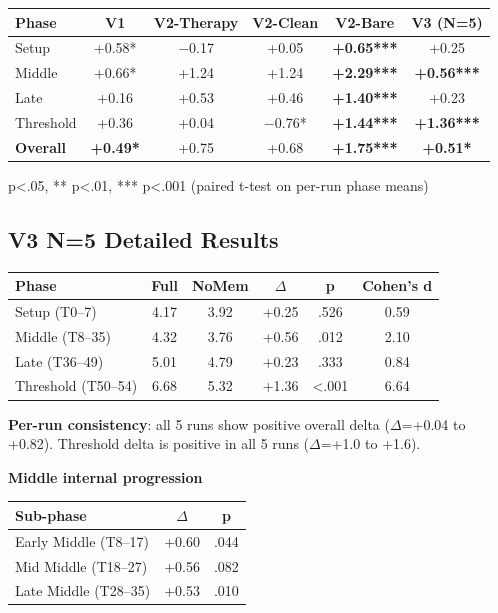 \documentclass[11pt]{article}
\begin{document}
\begin{table}[h]
\centering
\begin{tabular}{lccccc}
\toprule
Phase & V1 & V2-Therapy & V2-Clean & V2-Bare & V3 (N=5) \\
\midrule
Setup & +0.58* & $-$0.17 & +0.05 & \textbf{+0.65***} & +0.25 \\
Middle & +0.66* & +1.24 & +1.24 & \textbf{+2.29***} & \textbf{+0.56***} \\
Late & +0.16 & +0.53 & +0.46 & \textbf{+1.40***} & +0.23 \\
Threshold & +0.36 & +0.04 & $-$0.76* & \textbf{+1.44***} & \textbf{+1.36***} \\
\textbf{Overall} & \textbf{+0.49*} & +0.75 & +0.68 & \textbf{+1.75***} & \textbf{+0.51*} \\
\bottomrule
\end{tabular}
\end{table}

\noindent * p<.05, ** p<.01, *** p<.001 (paired t-test on per-run phase means)

\subsection{V3 N=5 Detailed Results}

\begin{table}[h]
\centering
\begin{tabular}{lccccc}
\toprule
Phase & Full & NoMem & $\Delta$ & p & Cohen's d \\
\midrule
Setup (T0--7) & 4.17 & 3.92 & +0.25 & .526 & 0.59 \\
Middle (T8--35) & 4.32 & 3.76 & +0.56 & .012 & 2.10 \\
Late (T36--49) & 5.01 & 4.79 & +0.23 & .333 & 0.84 \\
Threshold (T50--54) & 6.68 & 5.32 & +1.36 & <.001 & 6.64 \\
\bottomrule
\end{tabular}
\end{table}

\noindent\textbf{Per-run consistency}: all 5 runs show positive overall delta ($\Delta$=+0.04 to +0.82). Threshold delta is positive in all 5 runs ($\Delta$=+1.0 to +1.6).

\medskip
\noindent\textbf{Middle internal progression}

\begin{table}[h]
\centering
\begin{tabular}{lcc}
\toprule
Sub-phase & $\Delta$ & p \\
\midrule
Early Middle (T8--17) & +0.60 & .044 \\
Mid Middle (T18--27) & +0.56 & .082 \\
Late Middle (T28--35) & +0.53 & .010 \\
\bottomrule
\end{tabular}
\end{table}
\end{document}
